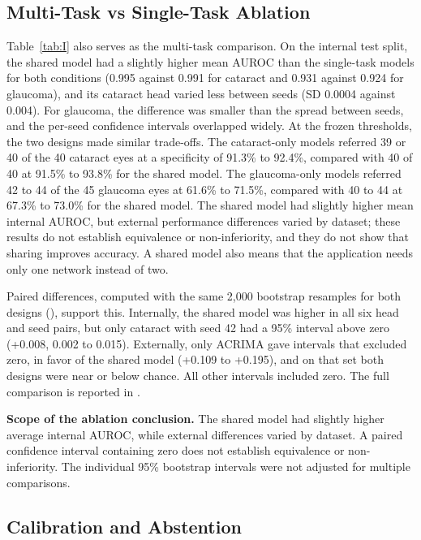 \documentclass[conference,a4paper]{IEEEtran}
\begin{document}
\subsection{Multi-Task vs Single-Task Ablation}

Table~\ref{tab:I} also serves as the multi-task comparison. On the internal test split, the shared
model had a slightly higher mean AUROC than the single-task models for both conditions (0.995
against 0.991 for cataract and 0.931 against 0.924 for glaucoma), and its cataract head varied less
between seeds (SD 0.0004 against 0.004). For glaucoma, the difference was smaller than the spread
between seeds, and the per-seed confidence intervals overlapped widely. At the frozen thresholds,
the two designs made similar trade-offs. The cataract-only models referred 39 or 40 of the 40
cataract eyes at a specificity of 91.3\% to 92.4\%, compared with 40 of 40 at 91.5\% to 93.8\% for
the shared model. The glaucoma-only models referred 42 to 44 of the 45 glaucoma eyes at 61.6\% to
71.5\%, compared with 40 to 44 at 67.3\% to 73.0\% for the shared model. The shared model had slightly higher mean internal AUROC, but external performance differences varied by dataset; these results do not establish equivalence or non-inferiority, and they do not show that sharing improves accuracy. A shared model also means that the application needs only one network instead of two.

Paired differences, computed with the same 2,000 bootstrap resamples for both designs
(), support this. Internally, the shared model was
higher in all six head and seed pairs, but only cataract with seed 42 had a 95\% interval above zero
(+0.008, 0.002 to 0.015). Externally, only ACRIMA gave intervals that excluded zero, in favor of
the shared model (+0.109 to +0.195), and on that set both designs were near or below chance. All
other intervals included zero. The full comparison is reported in
.



\textbf{Scope of the ablation conclusion.}
The shared model had slightly higher average internal AUROC, while external
differences varied by dataset. A paired confidence interval containing zero
does not establish equivalence or non-inferiority. The individual 95\%
bootstrap intervals were not adjusted for multiple comparisons.


\subsection{Calibration and Abstention}
\end{document}
